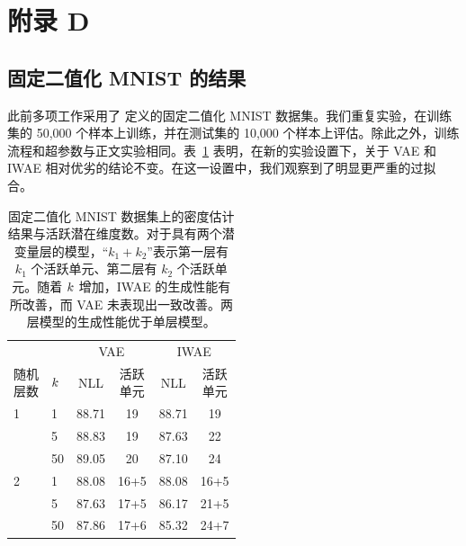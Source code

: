 \clearpage\section*{附录 D}
\label{app:binarization}

\subsection*{固定二值化 MNIST 的结果}

此前多项工作采用了 \cite{binarization} 定义的固定二值化 MNIST 数据集。我们重复实验，在训练集的 50,000 个样本上训练，并在测试集的 10,000 个样本上评估。除此之外，训练流程和超参数与正文实验相同。表~\ref{tbl:results_bin_fix} 表明，在新的实验设置下，关于 VAE 和 IWAE 相对优劣的结论不变。在这一设置中，我们观察到了明显更严重的过拟合。

\vspace{2ex}

\begin{table}[htbp]

\begin{center}
\begin{tabular}{@{}ll*{4}{c}@{}}

              &     & \multicolumn{2}{c}{VAE} & \multicolumn{2}{c}{IWAE} \\
\cmidrule(r){3-4} \cmidrule(l){5-6}  
\shortstack{随机\\层数} & $k$ & NLL               & \shortstack{活跃\\单元}             & NLL               & \shortstack{活跃\\单元}   \\ 
\cmidrule(lr){1-1} \cmidrule(lr){2-2} \cmidrule(lr){3-3}\cmidrule(lr){4-4}\cmidrule(lr){5-5}\cmidrule(lr){6-6} \midrule
1             & 1   & 88.71 &  19  & 88.71 &  19   \\
              & 5   & 88.83 &  19  & 87.63 &  22   \\
              & 50  & 89.05 &  20  & 87.10 &  24   \\ \midrule
2             & 1   & 88.08 &  16+5 & 88.08 &  16+5 \\
              & 5   & 87.63 &  17+5 & 86.17&  21+5 \\
              & 50  & 87.86 &  17+6 & 85.32&  24+7 \\ \bottomrule
\end{tabular}
\end{center}

\caption{固定二值化 MNIST 数据集上的密度估计结果与活跃潜在维度数。对于具有两个潜变量层的模型，“$k_1+k_2$”表示第一层有 $k_1$ 个活跃单元、第二层有 $k_2$ 个活跃单元。随着 $k$ 增加，IWAE 的生成性能有所改善，而 VAE 未表现出一致改善。两层模型的生成性能优于单层模型。}
\label{tbl:results_bin_fix}
\end{table}
